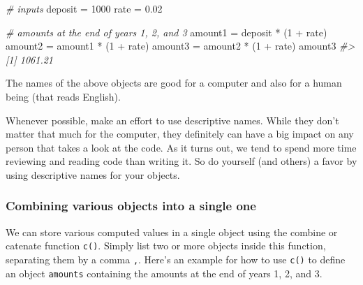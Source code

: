 \documentclass[
]{book}
\newenvironment{Shaded}{\begin{snugshade}}{\end{snugshade}}
\newcommand{\CommentTok}[1]{\textcolor[rgb]{0.56,0.35,0.01}{\textit{#1}}}
\newcommand{\DecValTok}[1]{\textcolor[rgb]{0.00,0.00,0.81}{#1}}
\newcommand{\FloatTok}[1]{\textcolor[rgb]{0.00,0.00,0.81}{#1}}
\newcommand{\NormalTok}[1]{#1}
\newcommand{\OtherTok}[1]{\textcolor[rgb]{0.56,0.35,0.01}{#1}}
\newcommand{\SpecialCharTok}[1]{\textcolor[rgb]{0.00,0.00,0.00}{#1}}
\begin{document}
\begin{Shaded}
\begin{Highlighting}[]
\CommentTok{\# inputs}
\NormalTok{deposit }\OtherTok{=} \DecValTok{1000}
\NormalTok{rate }\OtherTok{=} \FloatTok{0.02}

\CommentTok{\# amounts at the end of years 1, 2, and 3}
\NormalTok{amount1 }\OtherTok{=}\NormalTok{ deposit }\SpecialCharTok{*}\NormalTok{ (}\DecValTok{1} \SpecialCharTok{+}\NormalTok{ rate)}
\NormalTok{amount2 }\OtherTok{=}\NormalTok{ amount1 }\SpecialCharTok{*}\NormalTok{ (}\DecValTok{1} \SpecialCharTok{+}\NormalTok{ rate)}
\NormalTok{amount3 }\OtherTok{=}\NormalTok{ amount2 }\SpecialCharTok{*}\NormalTok{ (}\DecValTok{1} \SpecialCharTok{+}\NormalTok{ rate)}
\NormalTok{amount3}
\CommentTok{\#\textgreater{} [1] 1061.21}
\end{Highlighting}
\end{Shaded}

The names of the above objects are good for a computer and also for a human
being (that reads English).

Whenever possible, make an effort to use descriptive names. While they don't
matter that much for the computer, they definitely can have a big impact on
any person that takes a look at the code. As it turns out, we tend to spend
more time reviewing and reading code than writing it. So do yourself
(and others) a favor by using descriptive names for your objects.

\hypertarget{combining-various-objects-into-a-single-one}{%
\subsubsection*{Combining various objects into a single one}\label{combining-various-objects-into-a-single-one}}

We can store various computed values in a single object using the combine or
catenate function \texttt{c()}. Simply list two or more objects inside this function,
separating them by a comma \texttt{,}. Here's an example for how to use \texttt{c()} to
define an object \texttt{amounts} containing the amounts at the end of years 1, 2,
and 3.
\end{document}
